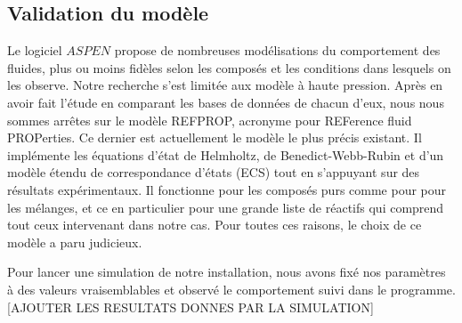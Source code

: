 \documentclass[a4paper, oneside, 12pt]{article}
\begin{document}
\subsection{Validation du modèle}

Le logiciel $ASPEN$ propose de nombreuses modélisations du comportement des fluides, 
plus ou moins fidèles selon les composés et les conditions dans lesquels on les observe. 
Notre recherche s'est limitée aux modèle à haute pression. 
Après en avoir fait l'étude en comparant les bases de données de chacun d'eux, 
nous nous sommes arrêtes sur le modèle REFPROP, acronyme pour REFerence fluid PROPerties. 
Ce dernier est actuellement le modèle le plus précis existant. 
Il implémente les équations d'état de Helmholtz, de Benedict-Webb-Rubin 
et d'un modèle étendu de correspondance d'états (ECS) tout en s'appuyant sur des résultats expérimentaux. 
Il fonctionne pour les composés purs comme pour pour les mélanges, 
et ce en particulier pour une grande liste de réactifs qui comprend tout ceux intervenant dans notre cas. 
Pour toutes ces raisons, le choix de ce modèle a paru judicieux.

Pour lancer une simulation de notre installation, 
nous avons fixé nos paramètres à des valeurs vraisemblables 
et observé le comportement suivi dans le programme. 
[AJOUTER LES RESULTATS DONNES PAR LA SIMULATION]

\printbibliography
\end{document}
